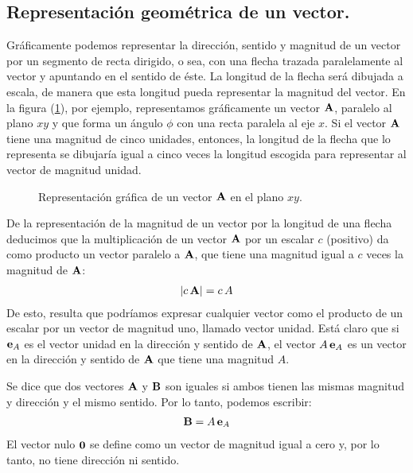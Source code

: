 \documentclass[12pt]{article}
\begin{document}
\subsection{Representación geométrica de un vector.} 

Gráficamente podemos representar la dirección, sentido y magnitud de un vector por un segmento de recta dirigido, o sea, con una flecha trazada paralelamente al vector y apuntando en el sentido de éste. La longitud de la flecha será dibujada a escala, de manera que esta longitud pueda representar la magnitud del vector. En la figura (\ref{fig:figura_01_01}), por ejemplo, representamos gráficamente un vector $\vb{A}$, paralelo al plano $x y$ y que forma un ángulo $\phi$ con una recta paralela al eje $x$. Si el vector $\vb{A}$ tiene una magnitud de cinco unidades, entonces, la longitud de la flecha que lo representa se dibujaría igual a cinco veces la longitud escogida para representar al vector de magnitud unidad. 
\begin{figure}[H]
    \centering
    \caption{Representación gráfica de un vector $\vb{A}$ en el plano $x y$.}
    \label{fig:figura_01_01}
\end{figure}
De la representación de la magnitud de un vector por la longitud de una flecha deducimos que la multiplicación de un vector $\vb{A}$ por un escalar $c$ (positivo) da como producto un vector paralelo a $\vb{A}$, que tiene una magnitud igual a $c$ veces la magnitud de $\vb{A}$:
\begin{align}
    \abs{c \, \vb{A}} = c \, A
    \label{eq:ecuacion_01_01}
\end{align} 
De esto, resulta que podríamos expresar cualquier vector como el producto de un escalar por un vector de magnitud uno, llamado vector unidad. Está claro que si $\vb{e}_{A}$ es el vector unidad en la dirección y sentido de $\vb{A}$, el vector $A \, \vb{e}_{A}$ es un vector en la dirección y sentido de $\vb{A}$ que tiene una magnitud $A$. 
\par
Se dice que dos vectores $\vb{A}$ y $\vb{B}$ son iguales si ambos tienen las mismas magnitud y dirección y el mismo sentido. Por lo tanto, podemos escribir:
\begin{align}
    \vb{B} = A \, \vb{e}_{A}
    \label{eq:ecuacion_01_02} 
\end{align}
El vector nulo $\vb{0}$ se define como un vector de magnitud igual a cero y, por lo tanto, no tiene dirección ni sentido.
\end{document}
